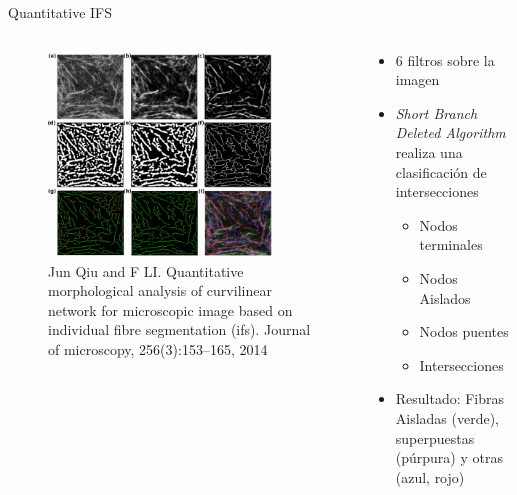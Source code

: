 \documentclass[aspectratio=169]{beamer}
\begin{document}


\begin{frame}{Quantitative IFS}
    \begin{columns}
        \begin{column}{0.6\textwidth}
             \begin{figure}
                \centering      \includegraphics[height=2.15in]{Pictures/QuantitativeIFS.png}
                \caption{Jun Qiu and F LI. Quantitative morphological analysis of curvilinear network for microscopic image based on individual fibre segmentation (ifs). Journal of microscopy, 256(3):153–165, 2014}
            \end{figure}       
        \end{column}
        \begin{column}{0.4\textwidth}
            \begin{itemize}\fontsize{9pt}{7.2}\selectfont
                \item 6 filtros sobre la imagen
                \item {\it Short Branch Deleted Algorithm} realiza una clasificación de intersecciones
                \begin{itemize}\fontsize{9pt}{7.2}\selectfont
                    \item Nodos terminales
                    \item Nodos Aislados
                    \item Nodos puentes
                    \item Intersecciones
                \end{itemize}
                \item Resultado: Fibras Aisladas (verde), superpuestas (púrpura) y otras (azul, rojo)
            \end{itemize}
        \end{column}
    \end{columns}
\end{frame}
\end{document}
